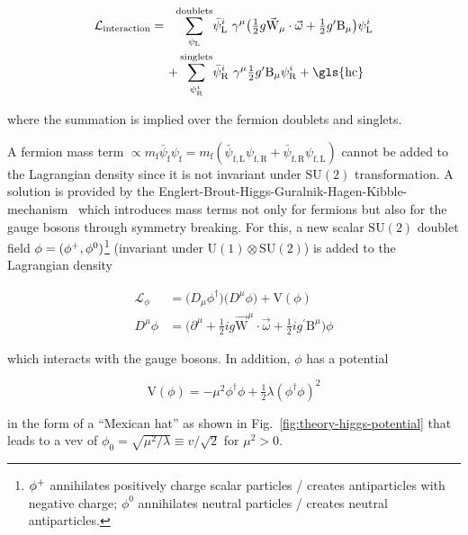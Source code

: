 \begin{align}
\mathcal{L}_\mathrm{interaction}=~~\sum_{\psi_\mathrm{L}}^\mathrm{doublets}&\bar{\psi}^{i}_\mathrm{L}~\gamma^{\mu}\big(\tfrac{1}{2}g\vec{\mathrm{W}}_{\mu}\cdot\vec{\omega}+\tfrac{1}{2}g^{\prime}\mathrm{B}_{\mu}\big)\psi^{i}_\mathrm{L} \nonumber\\
+\sum_{\psi^{i}_\mathrm{R}}^\mathrm{singlets}&\bar{\psi}^{i}_\mathrm{R}~\gamma^{\mu}\tfrac{1}{2}g^{\prime}\mathrm{B}_{\mu}\psi^{i}_\mathrm{R} + \mathrm{\gls{hc}} \label{eq:theory-codev-su2-interaction}
\end{align}

where the summation is implied over the fermion doublets and singlets.

A fermion mass term $\propto m_\mathrm{f}\bar{\psi}_\mathrm{f}\psi_\mathrm{f}=m_\mathrm{f}(\bar{\psi}_\mathrm{f,L}\psi_\mathrm{f,R}+\bar{\psi}_\mathrm{f,R}\psi_\mathrm{f,L})$ cannot be added to the Lagrangian density since it is not invariant under $\mathrm{SU(2)}$ transformation. A solution is provided by the Englert-Brout-Higgs-Guralnik-Hagen-Kibble-mechanism~\cite{HIGGS1964132,PhysRevLett.13.508,PhysRevLett.13.321,PhysRevLett.13.585} which introduces mass terms not only for fermions but also for the gauge bosons through symmetry breaking. For this, a new scalar $\mathrm{SU(2)}$ doublet field $\phi=(\phi^{+},\phi^{0})$\footnote{$\phi^{+}$ annihilates positively charge scalar particles / creates antiparticles with negative charge; $\phi^{0}$ annihilates neutral particles / creates neutral antiparticles.} (invariant under $\mathrm{U(1)}\otimes\mathrm{SU(2)}$) is added to the Lagrangian density

\begin{align}
\mathcal{L}_{\phi}&=\big(D_{\mu}\phi^{\dagger}\big)\big(D^{\mu}\phi\big)+\mathrm{V}(\phi) \label{eq:theory-phi-propagator} \\
D^{\mu}\phi&=\big(\partial^{\mu}+\tfrac{1}{2}ig\vec{\mathrm{W}}^{\mu}\cdot\vec{\omega}+\tfrac{1}{2}ig^{\prime}\mathrm{B}^{\mu}\big)\phi \label{eq:theory-phi-codev}
\end{align}

which interacts with the gauge bosons. In addition, $\phi$ has a potential 

\begin{equation}
\mathrm{V}(\phi)=-\mu^2\phi^\dagger\phi+\tfrac{1}{2}\lambda(\phi^\dagger\phi)^2
\end{equation}

in the form of a ``Mexican hat'' as shown in Fig.~\ref{fig:theory-higgs-potential} that leads to a \gls{vev} of $\phi_0=\sqrt{\mu^{2}/\lambda}\equiv v/\sqrt{2}$ for $\mu^2>0$.

